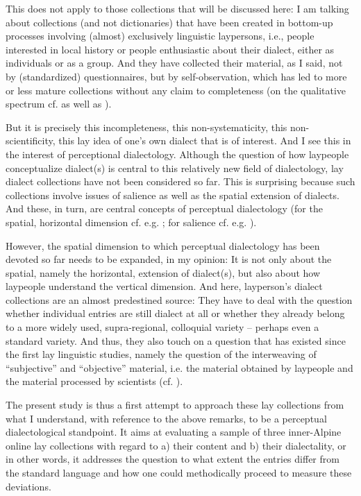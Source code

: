 \documentclass[output=paper]{langscibook}
\begin{document}
This does not apply to those collections that will be discussed here: I am talking about collections (and not dictionaries) that have been created in bottom-up processes involving (almost) exclusively linguistic laypersons, i.e., people interested in local history or people enthusiastic about their dialect, either as individuals or as a group. And they have collected their material, as I said, not by (standardized) questionnaires, but by self-observation, which has led to more or less mature collections without any claim to completeness (on the qualitative spectrum cf.  as well as \cite{Eickmans1980}).

But it is precisely this incompleteness, this non-systematicity, this non-sci\-en\-ti\-fi\-city, this lay idea of one’s own dialect that is of interest. And I see this in the interest of perceptional dialectology. Although the question of how laypeople conceptualize dialect(s) is central to this relatively new field of dialectology, lay dialect collections have not been considered so far. This is surprising because such collections involve issues of salience as well as the spatial extension of dialects. And these, in turn, are central concepts of perceptual dialectology (for the spatial, horizontal dimension cf. e.g. \citealt{Diercks1988, Auer2004, LameliEtAl2008, Anders2008, Preston2010, Hundt2010, Schröder2019}; for salience cf. e.g. \citealt{Lenz2010, Purschke2011, Purschke2014, Auer2014, AndersEtAl2014, ElmentalerEtAl2010, PalliwodaSchröder2016, Hettler2018}).

However, the spatial dimension to which perceptual dialectology has been devoted so far needs to be expanded, in my opinion: It is not only about the spatial, namely the horizontal, extension of dialect(s), but also about how laypeople understand the vertical dimension. And here, layperson’s dialect collections are an almost predestined source: They have to deal with the question whether individual entries are still dialect at all or whether they already belong to a more widely used, supra-regional, colloquial variety – perhaps even a standard variety. And thus, they also touch on a question that has existed since the first lay linguistic studies, namely the question of the interweaving of “subjective” and “objective” material, i.e. the material obtained by laypeople and the material processed by scientists (cf. \citealt{Preston1999}).

The present study is thus a first attempt to approach these lay collections from what I understand, with reference to the above remarks, to be a perceptual dialectological standpoint. It aims at evaluating a sample of three inner-Alpine online lay collections with regard to a) their content and b) their dialectality, or in other words, it addresses the question to what extent the entries differ from the standard language and how one could methodically proceed to measure these deviations.
\end{document}
